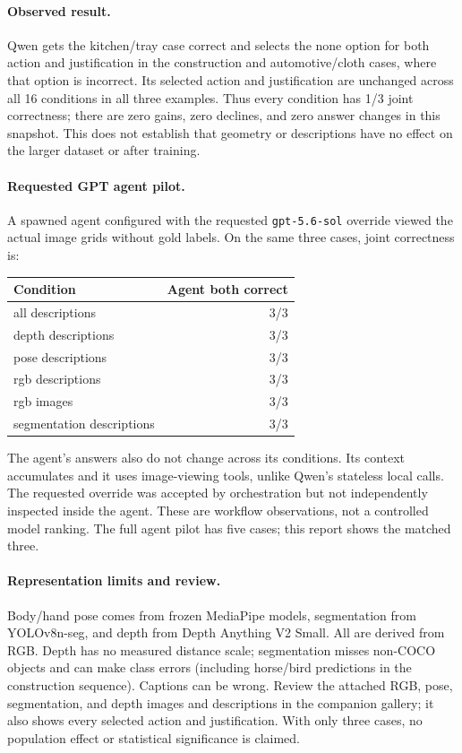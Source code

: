 \documentclass[10pt]{article}
\begin{document}
\paragraph{Observed result.} Qwen gets the kitchen/tray case correct and selects the none option for both action and justification in the construction and automotive/cloth cases, where that option is incorrect. Its selected action and justification are unchanged across all 16 conditions in all three examples. Thus every condition has 1/3 joint correctness; there are zero gains, zero declines, and zero answer changes in this snapshot. This does not establish that geometry or descriptions have no effect on the larger dataset or after training.
\paragraph{Requested GPT agent pilot.} A spawned agent configured with the requested \texttt{gpt-5.6-sol} override viewed the actual image grids without gold labels. On the same three cases, joint correctness is:
\begin{center}\small\begin{tabular}{lr}
Condition & Agent both correct\\\hline
all descriptions & 3/3 \\
depth descriptions & 3/3 \\
pose descriptions & 3/3 \\
rgb descriptions & 3/3 \\
rgb images & 3/3 \\
segmentation descriptions & 3/3 \\
\end{tabular}\end{center}
\noindent The agent's answers also do not change across its conditions. Its context accumulates and it uses image-viewing tools, unlike Qwen's stateless local calls. The requested override was accepted by orchestration but not independently inspected inside the agent. These are workflow observations, not a controlled model ranking. The full agent pilot has five cases; this report shows the matched three.
\paragraph{Representation limits and review.} Body/hand pose comes from frozen MediaPipe models, segmentation from YOLOv8n-seg, and depth from Depth Anything V2 Small. All are derived from RGB. Depth has no measured distance scale; segmentation misses non-COCO objects and can make class errors (including horse/bird predictions in the construction sequence). Captions can be wrong. Review the attached RGB, pose, segmentation, and depth images and descriptions in the companion gallery; it also shows every selected action and justification. With only three cases, no population effect or statistical significance is claimed.
\end{document}
